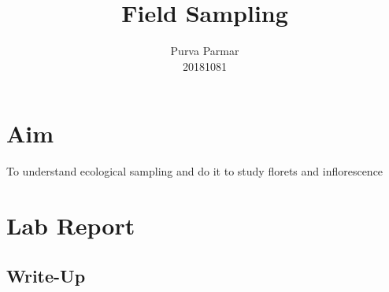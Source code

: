 \documentclass[twocolumn]{article}
\title{Field Sampling}
\author{Purva Parmar \\ 20181081}
\date{}
\begin{document}
\graphicspath{{../}}
\setlength{\parindent}{0pt}
\setlength{\parskip}{\baselineskip}

\maketitle

\section{Aim}

To understand ecological sampling and do it to study florets and inflorescence

\section{Lab Report}
\subsection{Write-Up}
\end{document}
